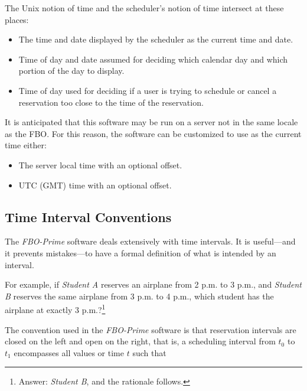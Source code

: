 \documentclass[letterpaper,10pt,titlepage]{article}
\newcommand{\productbasename}{FBO-Prime}
\begin{document}
The Unix notion of time and the scheduler's notion of time intersect at these places:

\begin{itemize}
\item The time and date displayed by the scheduler as the current time and date.
\item Time of day and date assumed for deciding which calendar day and which portion of the day to
      display.
\item Time of day used for deciding if a user is trying to schedule or cancel a reservation
      too close to the time of the reservation.
\end{itemize}

It is anticipated that this software may be run on a server not in the same
locale
as the FBO.  For this reason, the software can be customized to
use as the current time either:

\begin{itemize}
\item The server local time with an optional offset.
\item UTC (GMT) time with an optional offset.
\end{itemize}


\subsection{Time Interval Conventions}
\label{stbg0:stic0}

The \emph{\productbasename{}} software deals extensively
with time intervals.  
It is useful---and it prevents mistakes---to have
a formal definition of what is intended by an interval.

For example, if \emph{Student A} reserves an airplane from 2 p.m. to
3 p.m., and \emph{Student B} reserves the same airplane from 3 p.m. to
4 p.m., which student has the airplane at exactly 3 p.m.?\footnote{Answer:
\emph{Student B}, and the rationale follows.}

The convention used in the \emph{\productbasename{}} software
is that reservation intervals are 
closed on the left and 
open
on the right, that is, a scheduling interval from $t_0$ to
$t_1$ encompasses all values or time $t$ such that
\end{document}
